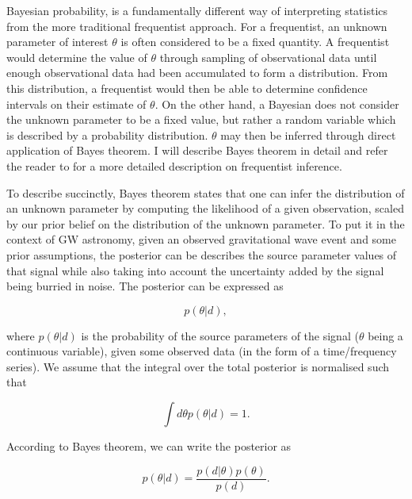 %
%
Bayesian probability, is a fundamentally different way of interpreting 
statistics from the more traditional frequentist approach. For a frequentist, 
an unknown parameter of interest $\theta$ is often considered to be a fixed quantity. 
A frequentist would determine the value of $\theta$ through sampling of 
observational data until enough observational data had been accumulated to 
form a distribution. From this distribution, a frequentist would then be 
able to determine confidence intervals on their estimate of $\theta$. 
On the other hand, 
a Bayesian does not consider the unknown parameter to be a fixed value, 
but rather a random variable which is described by a probability distribution.
$\theta$ may then be inferred through direct application of Bayes theorem.
I will describe Bayes theorem in detail and refer the reader to \cite{10.2307/91337} for 
a more detailed description on frequentist inference.

%
%
To describe succinctly, Bayes theorem states that one can infer the distribution of an unknown parameter by computing the likelihood of a given observation, scaled by our prior belief on the distribution of the unknown parameter. To put it in the context of \ac{GW} astronomy, given an observed gravitational wave event and some prior assumptions, the posterior can be describes the source parameter values of that signal while also taking into account the uncertainty added by the signal being burried in noise. The posterior can be expressed 
as

%
%
\begin{equation}
    p(\theta | d),
\end{equation}

where $p(\theta | d)$ is the probability of the source parameters of the signal ($\theta$ being a continuous variable), given some observed data (in the form of a time/frequency series). We assume that the integral over the total posterior is normalised such that 

%
%
\begin{equation}
    \int d\theta p(\theta | d) = 1.
\end{equation}

According to Bayes theorem, we can write the posterior as 

%
%
\begin{equation}
    p(\theta | d) = \frac{p(d|\theta)p(\theta)}{p(d)}.
\end{equation}\label{eq:intro_bayes_theorem}

